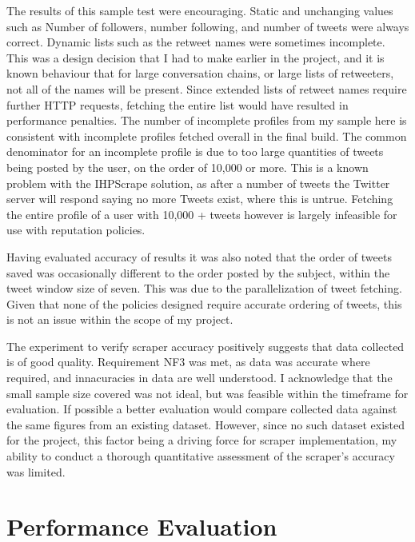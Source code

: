 The results of this sample test were encouraging. Static and unchanging values such as Number of followers, number following, and number of tweets were always correct. Dynamic lists such as the retweet names were sometimes incomplete. This was a design decision that I had to make earlier in the project, and it is known behaviour that for large conversation chains, or large lists of retweeters, not all of the names will be present. Since extended lists of retweet names require further HTTP requests, fetching the entire list would have resulted in performance penalties. The number of incomplete profiles from my sample here is consistent with incomplete profiles fetched overall in the final build. The common denominator for an incomplete profile is due to too large quantities of tweets being posted by the user, on the order of 10,000 or more. This is a known problem with the IHPScrape solution, as after a number of tweets the Twitter server will respond saying no more Tweets exist, where this is untrue. 
Fetching the entire profile of a user with 10,000 + tweets however is largely infeasible for use with reputation policies.

Having evaluated accuracy of results it was also noted that the order of tweets saved was occasionally different to the order posted by the subject, within the tweet window size of seven. This was due to the parallelization of tweet fetching. Given that none of the policies designed require accurate ordering of tweets, this is not an issue within the scope of my project. 

The experiment to verify scraper accuracy positively suggests that data collected is of good quality. Requirement NF3 was met, as data was accurate where required, and innacuracies in data are well understood. I acknowledge that the small sample size covered was not ideal, but was feasible within the timeframe for evaluation. If possible a better evaluation would compare collected data against the same figures from an existing dataset. However, since no such dataset existed for the project, this factor being a driving force for scraper implementation, my ability to conduct a thorough quantitative assessment of the scraper's accuracy was limited.

\section{Performance Evaluation}


